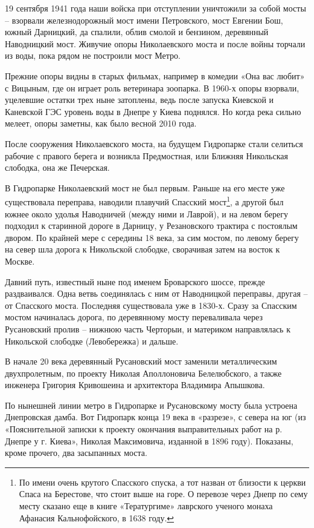 19 сентября 1941 года наши войска при отступлении уничтожили за собой мосты – взорвали железнодорожный мост имени Петровского, мост Евгении Бош, южный Дарницкий, да спалили, облив смолой и бензином, деревянный Наводницкий мост. Живучие опоры Николаевского моста и после войны торчали из воды, пока рядом не построили мост Метро.

Прежние опоры видны в старых фильмах, например в комедии «Она вас любит» с Вицыным, где он играет роль ветеринара зоопарка. В 1960-х опоры взорвали, уцелевшие остатки трех ныне затоплены, ведь после запуска Киевской и Каневской ГЭС уровень воды в Днепре у Киева поднялся. Но когда река сильно мелеет, опоры заметны, как было весной 2010 года.

После сооружения Николаевского моста, на будущем Гидропарке стали селиться рабочие с правого берега и возникла Предмостная, или Ближняя Никольская слободка, она же Печерская.

В Гидропарке Николаевский мост не был первым. Раньше на его месте уже существовала переправа, наводили плавучий Спасский мост\footnote{По имени очень крутого Спасского спуска, а тот назван от близости к церкви Спаса на Берестове, что стоит выше на горе. О перевозе через Днепр по сему месту сказано еще в книге «Тератургиме» лаврского ученого монаха Афанасия Кальнофойского, в 1638 году.}, а другой был южнее около удолья Наводничей (между ними и Лаврой), и на левом берегу подходил к старинной дороге в Дарницу, у Резановского трактира с постоялым двором. По крайней мере с середины 18 века, за сим мостом, по левому берегу на север шла дорога к Никольской слободке, сворачивая затем на восток к Москве.

Давний путь, известный ныне под именем Броварского шоссе, прежде раздваивался. Одна ветвь соединялась с ним от Наводницкой переправы, другая – от Спасского моста. Последняя существовала уже в 1830-х. Сразу за Спасским мостом начиналась дорога, по деревянному мосту переваливала через Русановский пролив – нижнюю часть Черторыи, и материком направлялась к Никольской слободке (Левобережка) и дальше.

В начале 20 века деревянный Русановский мост заменили металлическим двухпролетным, по проекту Николая Аполлоновича Белелюбского, а также инженера Григория Кривошеина и архитектора Владимира Апышкова.

По нынешней линии метро в Гидропарке и Русановскому мосту была устроена Днепровская дамба. Вот Гидропарк конца 19 века в «разрезе», с севера на юг (из «Пояснительной записки к проекту окончания выправительных работ на р. Днепре у г. Киева», Николая Максимовича, изданной в 1896 году). Показаны, кроме прочего, два засыпанных моста.

